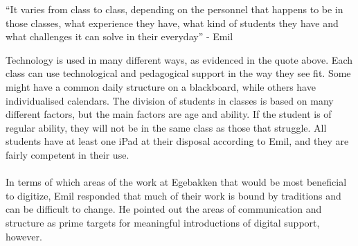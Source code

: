 \begin{displayquote}
    ``It varies from class to class, depending on the personnel that happens to be in those classes, what experience they have, what kind of students they have and what challenges it can solve in their everyday'' - Emil
\end{displayquote}
Technology is used in many different ways, as evidenced in the quote above. 
Each class can use technological and pedagogical support in the way they see fit.
Some might have a common daily structure on a blackboard, while others have individualised calendars.
The division of students in classes is based on many different factors, but the main factors are age and ability. 
If the student is of regular ability, they will not be in the same class as those that struggle.
All students have at least one iPad at their disposal according to Emil, and they are fairly competent in their use.
\\\\
In terms of which areas of the work at Egebakken that would be most beneficial to digitize, Emil responded that much of their work is bound by traditions and can be difficult to change.
He pointed out the areas of communication and structure as prime targets for meaningful introductions of digital support, however. 

